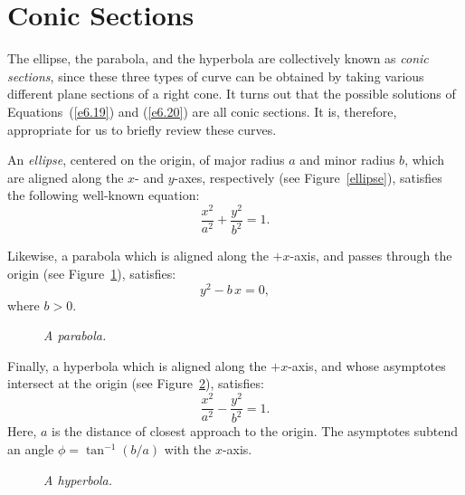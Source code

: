 \section{Conic Sections}
The ellipse, the parabola, and the hyperbola are collectively known
as {\em conic sections}, since these three  types of curve  can be obtained
by taking various different plane sections of a right cone. It turns out that the possible
solutions of Equations~(\ref{e6.19}) and (\ref{e6.20}) are all conic sections. It is,
therefore, appropriate for us to briefly review these curves.

An {\em ellipse}, centered on the origin, of major radius $a$ and minor radius $b$, which are aligned
along the $x$- and $y$-axes, respectively (see Figure~\ref{ellipse}), satisfies the following
well-known equation:
\begin{equation}\label{e6.21}
\frac{x^2}{a^2} + \frac{y^2}{b^2} = 1.
\end{equation}

Likewise, a parabola which is aligned along the $+x$-axis, and passes through
the origin (see Figure~\ref{parabola}), satisfies:
\begin{equation}\label{e6.22}
y^2 - b\,x = 0,
\end{equation}
where $b>0$. 

\begin{figure}
\epsfysize=2.25in
\centerline{}
\caption{\em A parabola.}\label{parabola}
\end{figure}

Finally, a hyperbola which is aligned along the $+x$-axis, and whose
asymptotes intersect at the origin (see Figure~\ref{hyperbola}), satisfies:
\begin{equation}\label{e6.23}
\frac{x^2}{a^2} - \frac{y^2}{b^2} = 1.
\end{equation}
Here, $a$ is the distance of closest approach to the origin. The
asymptotes subtend an angle $\phi=\tan^{-1}(b/a)$ with the $x$-axis.

\begin{figure}
\epsfysize=2.25in
\centerline{}
\caption{\em A hyperbola.}\label{hyperbola}
\end{figure}

